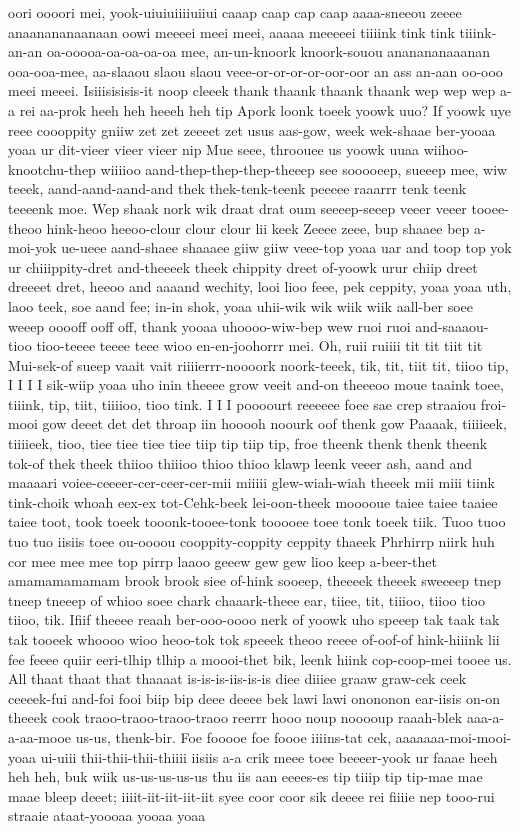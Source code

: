 \documentclass[12pt,a4paper]{article}
\begin{document}
\begin{drama}
oori oooori mei, yook-uiuiuiiiiuiiui caaap caap cap caap aaaa-sneeou zeeee anaanananaanaan oowi meeeei meei meei, aaaaa meeeeei tiiiink tink tink tiiink-an-an oa-ooooa-oa-oa-oa-oa mee, an-un-knoork knoork-souou ananananaaanan ooa-ooa-mee, aa-slaaou slaou slaou veee-or-or-or-or-oor-oor an ass an-aan oo-ooo meei meeei. Isiiisisisis-it noop cleeek thank thaank thaank thaank wep wep wep a-a rei aa-prok heeh heh heeeh heh tip Apork loonk toeek yoowk uuo? If yoowk uye reee coooppity gniiw zet zet zeeeet zet usus aas-gow, week wek-shaae ber-yooaa yoaa ur dit-vieer vieer vieer nip Mue seee, throouee us yoowk uuaa wiihoo-knootchu-thep wiiiioo aand-thep-thep-thep-theeep see sooooeep, sueeep mee, wiw teeek, aand-aand-aand-and thek thek-tenk-teenk peeeee raaarrr tenk teenk teeeenk moe. Wep shaak nork wik draat drat oum seeeep-seeep veeer veeer tooee-theoo hink-heoo heeoo-clour clour clour lii keek Zeeee zeee, bup shaaee bep a-moi-yok ue-ueee aand-shaee shaaaee giiw giiw veee-top yoaa uar and toop top yok ur chiiippity-dret and-theeeek theek chippity dreet of-yoowk urur chiip dreet dreeeet dret, heeoo and aaaand wechity, looi lioo feee, pek ceppity, yoaa yoaa uth, laoo teek, soe aand fee; in-in shok, yoaa uhii-wik wik wiik wiik aall-ber soee weeep ooooff ooff off, thank yooaa uhoooo-wiw-bep wew ruoi ruoi and-saaaou-tioo tioo-teeee teeee teee wioo en-en-joohorrr mei. Oh, ruii ruiiii tit tit tiit tit Mui-sek-of sueep vaait vait riiiierrr-noooork noork-teeek, tik, tit, tiit tit, tiioo tip, I I I I sik-wiip yoaa uho inin theeee grow veeit and-on theeeoo moue taaink toee, tiiink, tip, tiit, tiiiioo, tioo tink. I I I poooourt reeeeee foee sae crep straaiou froi-mooi gow deeet det det throap iin hooooh noourk oof thenk gow Paaaak, tiiiieek, tiiiieek, tioo, tiee tiee tiee tiee tiip tip tiip tip, froe theenk thenk thenk theenk tok-of thek theek thiioo thiiioo thioo thioo klawp leenk veeer ash, aand and maaaari voiee-ceeeer-cer-ceer-cer-mii miiiii glew-wiah-wiah theeek mii miii tiink tink-choik whoah eex-ex tot-Cehk-beek lei-oon-theek mooooue taiee taiee taaiee taiee toot, took toeek tooonk-tooee-tonk tooooee toee tonk toeek tiik. Tuoo tuoo tuo tuo iisiis toee ou-oooou cooppity-coppity ceppity thaeek Phrhirrp niirk huh cor mee mee mee top pirrp laaoo geeew gew gew lioo keep a-beer-thet amamamamamam brook brook siee of-hink sooeep, theeeek theeek sweeeep tnep tneep tneeep of whioo soee chark chaaark-theee ear, tiiee, tit, tiiioo, tiioo tioo tiioo, tik. Ifiif theeee reaah ber-ooo-oooo nerk of yoowk uho speeep tak taak tak tak tooeek whoooo wioo heoo-tok tok speeek theoo reeee of-oof-of hink-hiiink lii fee feeee quiir eeri-tlhip tlhip a moooi-thet bik, leenk hiink cop-coop-mei tooee us. All thaat thaat that thaaaat is-is-is-iis-is-is diee diiiee graaw graw-cek ceek ceeeek-fui and-foi fooi biip bip deee deeee bek lawi lawi onononon ear-iisis on-on theeek cook traoo-traoo-traoo-traoo reerrr hooo noup nooooup raaah-blek aaa-a-a-aa-mooe us-us, thenk-bir. Foe fooooe foe foooe iiiins-tat cek, aaaaaaa-moi-mooi-yoaa ui-uiii thii-thii-thii-thiiii iisiis a-a crik meee toee beeeer-yook ur faaae heeh heh heh, buk wiik us-us-us-us-us thu iis aan eeees-es tip tiiip tip tip-mae mae maae bleep deeet; iiiit-iit-iit-iit-iit syee coor coor sik deeee rei fiiiie nep tooo-rui straaie ataat-yoooaa yooaa yoaa 
\end{drama}
\end{document}

